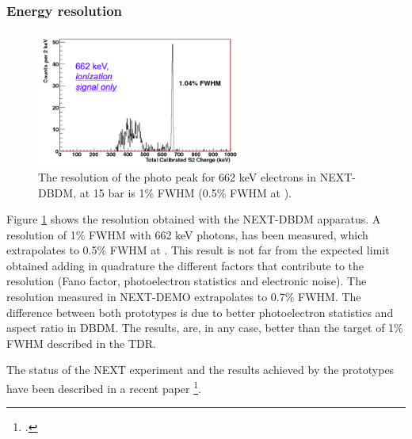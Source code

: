 \subsubsection*{Energy resolution}


\begin{figure}
\centering
\includegraphics[width=0.6\textwidth]{img/Cs660.png}
\caption{\small The resolution of the photo peak for 662 keV electrons in NEXT-DBDM, at 15 bar is 1\% FWHM (0.5\% FWHM at \Qbb).}\label{fig.ERES}
\end{figure}

Figure \ref{fig.ERES} shows the resolution obtained with the NEXT-DBDM apparatus. A resolution of 1\% FWHM with 
662 keV photons, has been measured, which extrapolates to 0.5\% FWHM at \Qbb. This result is not far from the expected limit obtained adding in quadrature the different factors that contribute to the resolution (Fano factor, photoelectron statistics and electronic noise). The resolution measured in NEXT-DEMO extrapolates to 0.7\% FWHM. The difference between both prototypes is due to better photoelectron statistics and aspect ratio in DBDM. The results, are, in any case, better than the target of 1\% FWHM described in the TDR.

The status of the NEXT experiment and the results achieved by the prototypes have been described in a recent
paper \footcite{Gomez-Cadenas:2013lta}.

